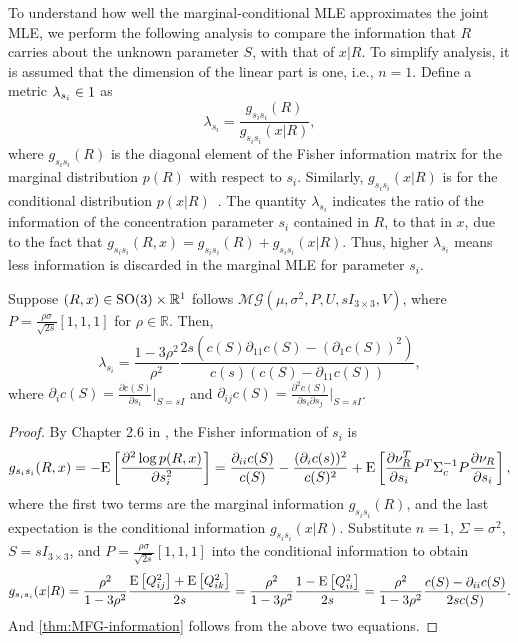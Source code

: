 To understand how well the marginal-conditional MLE approximates the joint MLE, we perform the following analysis to compare the information that $R$ carries about the unknown parameter $S$, with that of $x|R$.
To simplify analysis, it is assumed that the dimension of the linear part is one, i.e., $n=1$.
Define a metric  $\lambda_{s_i}\in\real{1}$ as
\begin{equation}
	\lambda_{s_i} = \frac{g_{s_is_i}(R)}{g_{s_is_i}(x|R)},
\end{equation}
where $g_{s_is_i}(R)$ is the diagonal element of the Fisher information matrix for the marginal distribution $p(R)$ with respect to $s_i$.
Similarly, $g_{s_is_i}(x|R)$ is for the conditional distribution $p(x|R)$~\cite[Chapter 9.8]{kullback1997information}.
The quantity $\lambda_{s_i}$ indicates the ratio of the information of the concentration parameter $s_i$ contained in $R$, to that in $x$, due to the fact that $g_{s_is_i}(R,x) = g_{s_is_i}(R)+g_{s_is_i}(x|R)$.
Thus, higher $\lambda_{s_i}$ means less information is discarded in the marginal MLE for parameter $s_i$.

\begin{theorem} \label{thm:MFG-information}
	Suppose $(R,x)\in\mathrm{SO}(3)\times\mathbb{R}^1$ follows  $\mathcal{MG}(\mu,\sigma^2,P,U,sI_{3\times 3},V)$, where $P = \frac{\rho\sigma}{\sqrt{2s}} [1,1,1]$ for $\rho\in\mathbb{R}$. Then,
	\begin{equation} \label{eqn:MFG-information}
		\lambda_{s_i} = \frac{1-3\rho^2}{\rho^2} \frac{2s\left(c(S)\partial_{11}c(S) - (\partial_1c(S))^2\right)}{c(s)\left(c(S)-\partial_{11}c(S)\right)},
	\end{equation}
	where $\partial_i c(S) = \frac{\partial c(S)}{\partial s_i} \big|_{S=sI}$ and $\partial_{ij} c(S) = \frac{\partial^2 c(S)}{\partial s_i \partial s_j} \big|_{S = sI}$.
\end{theorem}
\begin{proof}
	By Chapter 2.6 in \cite{kullback1997information}, the Fisher information of $s_i$ is
	\begin{align*}
		g_{s_is_i}(R,x) = -\mathrm{E}\left[ \frac{\partial^2 \log p(R,x)}{\partial s_i^2} \right] = \frac{\partial_{ii}c(S)}{c(S)} - \frac{(\partial_i c(s))^2}{c(S)^2} + \mathrm{E}\left[ \frac{\partial \nu_R^T}{\partial s_i}P^T\Sigma_c^{-1}P\frac{\partial \nu_R}{\partial s_i} \right],
	\end{align*}
	where the first two terms are the marginal information $g_{s_is_i}(R)$, and the last expectation is the conditional information $g_{s_is_i}(x|R)$.
	Substitute $n=1$, $\Sigma = \sigma^2$, $S = sI_{3\times 3}$, and $P = \frac{\rho\sigma}{\sqrt{2s}}[1,1,1]$ into the conditional information to obtain
	\begin{align*}
		g_{s_is_i}(x|R) = \frac{\rho^2}{1-3\rho^2} \frac{\mathrm{E}\left[ Q_{ij}^2 \right]+\mathrm{E}\left[ Q_{ik}^2 \right]}{2s} = \frac{\rho^2}{1-3\rho^2}\frac{1-\mathrm{E}\left[ Q_{ii}^2 \right]}{2s} = \frac{\rho^2}{1-3\rho^2} \frac{c(S)-\partial_{ii}c(S)}{2sc(S)}.
	\end{align*}
	And \eqref{thm:MFG-information} follows from the above two equations.
\end{proof}


